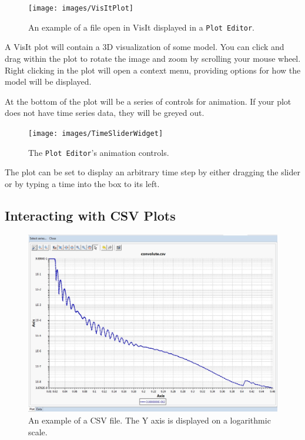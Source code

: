 \begin{figure}[!h]
\texttt{[image: images/VisItPlot]}
\centering
\caption{An example of a file open in VisIt displayed in a \texttt{Plot
Editor}.}
\label{fig:visitplot}
\end{figure}

A VisIt plot will contain a 3D visualization of some model. You can click and
drag within the plot to rotate the image and zoom by scrolling your mouse wheel.
Right clicking in the plot will open a context menu, providing options for how
the model will be displayed.

At the bottom of the plot will be a series of controls for animation. If your
plot does not have time series data, they will be greyed out. 

\begin{figure}[!h]
\texttt{[image: images/TimeSliderWidget]} 
\centering
\caption{The \texttt{Plot Editor}'s animation controls.}
\label{fig:timesliderwidget}
\end{figure}

The plot can be set to display an arbitrary time step by either dragging the
slider or by typing a time into the box to its left.

\subsection{Interacting with CSV Plots}

\begin{figure}[!h]
\includegraphics[width=12cm]{images/CSVGraph}
\centering
\caption{An example of a CSV file. The Y axis is displayed on a logarithmic
scale.}
\label{fig:CSVGraph}
\end{figure}

